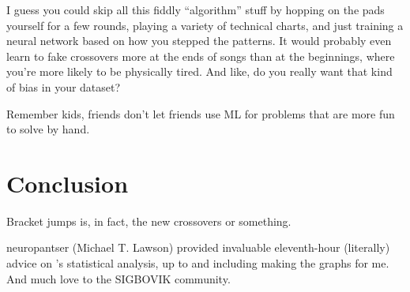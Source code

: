 \documentclass[10pt]{sigplanconf}
\begin{document}
I guess you could skip all this fiddly ``algorithm'' stuff by
hopping on the pads yourself for a few rounds, playing a variety of technical charts,
and just training a neural network based on how you stepped the patterns.
It would probably even learn to fake crossovers more at the ends of songs than at the beginnings,
where you're more likely to be physically tired.
And like, do you really want that kind of bias in your dataset?

Remember kids, friends don't let friends use ML for problems that are more fun to solve by hand.

\section{Conclusion}

Bracket jumps is, in fact, the new crossovers or something.

\acks

neuropantser (Michael T. Lawson) provided invaluable eleventh-hour (literally) advice
on 's statistical analysis, up to and including making the graphs for me.
And much love to the SIGBOVIK community.




\end{document}

